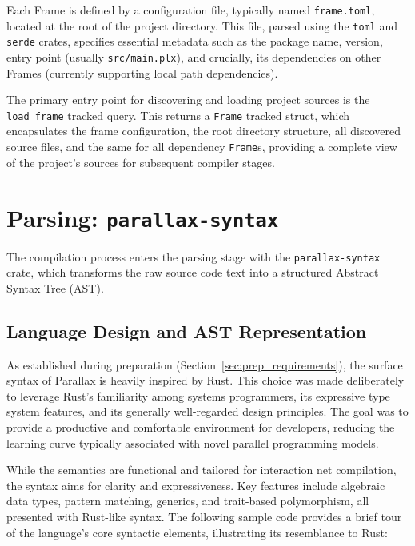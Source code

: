 Each Frame is defined by a configuration file, typically named \texttt{frame.toml}, located at the root of the project directory. This file, parsed using the \texttt{toml} and \texttt{serde} crates, specifies essential metadata such as the package name, version, entry point (usually \texttt{src/main.plx}), and crucially, its dependencies on other Frames (currently supporting local path dependencies). 

The primary entry point for discovering and loading project sources is the \texttt{load\_frame} tracked query. This returns a \texttt{Frame} tracked struct, which encapsulates the frame configuration, the root directory structure, all discovered source files, and the same for all dependency \texttt{Frame}s, providing a complete view of the project's sources for subsequent compiler stages.

\section{Parsing: \texttt{parallax-syntax}}

The compilation process enters the parsing stage with the \texttt{parallax-syntax} crate, which transforms the raw source code text into a structured Abstract Syntax Tree (AST).

\subsection{Language Design and AST Representation}

As established during preparation (Section~\ref{sec:prep_requirements}), the surface syntax of Parallax is heavily inspired by Rust. This choice was made deliberately to leverage Rust's familiarity among systems programmers, its expressive type system features, and its generally well-regarded design principles. The goal was to provide a productive and comfortable environment for developers, reducing the learning curve typically associated with novel parallel programming models.

While the semantics are functional and tailored for interaction net compilation, the syntax aims for clarity and expressiveness. Key features include algebraic data types, pattern matching, generics, and trait-based polymorphism, all presented with Rust-like syntax. The following sample code provides a brief tour of the language's core syntactic elements, illustrating its resemblance to Rust:

